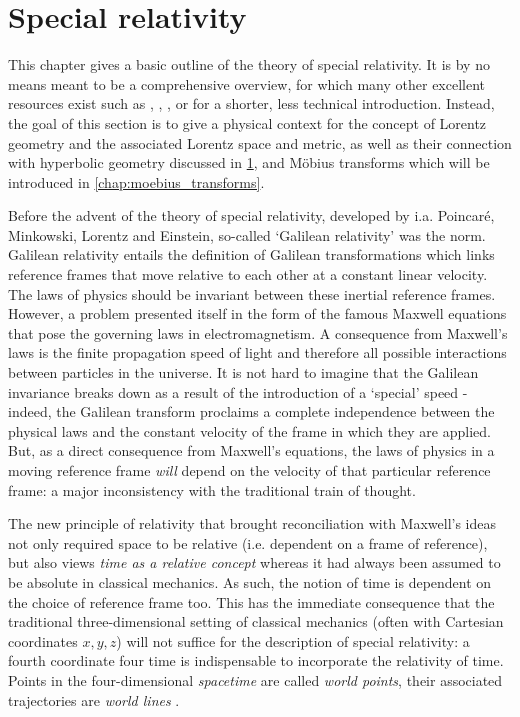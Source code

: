 \chapter{Special relativity}
\label{chap:relativity}
This chapter gives a basic outline of the theory of special relativity. It is by no means meant to be a comprehensive overview, for which many other excellent resources exist such as \citet{Misner1970}, \citet{Taylor1992}, \citet{Landau1971}, or \citet{Penrose1978} for a shorter, less technical introduction. Instead, the goal of this section is to give a physical context for the concept of Lorentz geometry and the associated Lorentz space and metric, as well as their connection with hyperbolic geometry discussed in \cref{chap:relativity}, and Möbius transforms which will be introduced in \cref{chap:moebius_transforms}.

Before the advent of the theory of special relativity, developed by i.a. Poincaré, Minkowski, Lorentz and Einstein, so-called `Galilean relativity' was the norm. Galilean relativity entails the definition of Galilean transformations which links reference frames that move relative to each other at a constant linear velocity. The laws of physics should be invariant between these inertial reference frames. However, a problem presented itself in the form of the famous Maxwell equations that pose the governing laws in electromagnetism. A consequence from Maxwell's laws is the finite propagation speed of light and therefore all possible interactions between particles in the universe. It is not hard to imagine that the Galilean invariance breaks down as a result of the introduction of a `special' speed - indeed, the Galilean transform proclaims a complete independence between the physical laws and the constant velocity of the frame in which they are applied. But, as a direct consequence from Maxwell's equations, the laws of physics in a moving reference frame \emph{will} depend on the velocity of that particular reference frame: a major inconsistency with the traditional train of thought.

The new principle of relativity that brought reconciliation with Maxwell's ideas not only required space to be relative (i.e. dependent on a frame of reference), but also views \emph{time as a relative concept} whereas it had always been assumed to be absolute in classical mechanics. As such, the notion of time is dependent on the choice of reference frame too. This has the immediate consequence that the traditional three-dimensional setting of classical mechanics (often with Cartesian coordinates \(x, y, z\)) will not suffice for the description of special relativity: a fourth coordinate four time is indispensable to incorporate the relativity of time. Points in the four-dimensional \emph{spacetime} are called \emph{world points}, their associated trajectories are \emph{world lines} \cite{Landau1971}.

